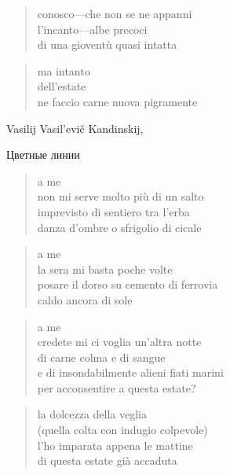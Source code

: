 	\begin{verse}
		conosco—che non se ne appanni\\
		l’incanto—albe precoci\\
		di una gioventù quasi intatta
	\end{verse}

	\begin{verse}
		ma intanto\\
		dell’estate\\
		ne faccio carne nuova
		pigramente
	\end{verse}

\clearpage


\begin{artItem}
	Vasilij Vasil'evič Kandinskij, \begin{otherlanguage}{russian}%
		Цветные линии%
	\end{otherlanguage}
\end{artItem}

	\begin{verse}
		a me\\
		non mi serve molto più di un salto\\
		imprevisto di sentiero tra l'erba\\
		danza d'ombre o sfrigolio di cicale
	\end{verse}

	\begin{verse}
		a me\\
		la sera mi basta poche volte\\
		posare il dorso su cemento di ferrovia\\
		caldo ancora di sole
	\end{verse}

	\begin{verse}
		a me\\
		credete mi ci voglia un'altra notte\\
		di carne colma e di sangue\\
		e di insondabilmente alieni fiati marini\\
		per acconsentire a questa estate?
	\end{verse}

\clearpage


	\begin{verse}
		la dolcezza della veglia\\
		(quella colta con indugio colpevole)\\
		l'ho imparata appena le mattine\\
		di questa estate già accaduta
	\end{verse}


